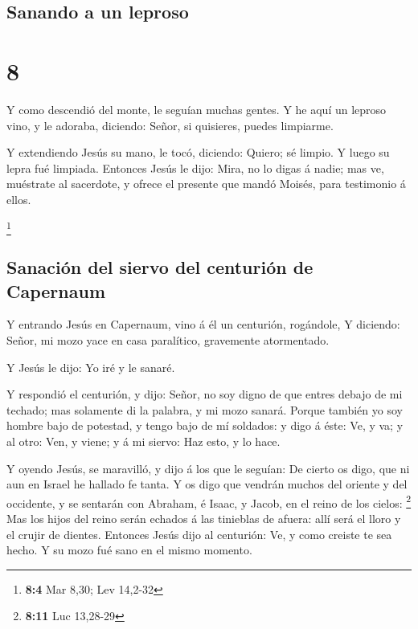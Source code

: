 \hypertarget{sanando-a-un-leproso}{%
\subsection{Sanando a un leproso}\label{sanando-a-un-leproso}}

\hypertarget{section-7}{%
\section{8}\label{section-7}}

 Y como descendió del monte, le seguían muchas gentes.
 Y he aquí un leproso vino, y le adoraba, diciendo: Señor,
si quisieres, puedes limpiarme.

 Y extendiendo Jesús su mano, le tocó, diciendo: Quiero; sé
limpio. Y luego su lepra fué limpiada.  Entonces Jesús le
dijo: Mira, no lo digas á nadie; mas ve, muéstrate al sacerdote, y
ofrece el presente que mandó Moisés, para testimonio á ellos.

\footnote{\textbf{8:4} Mar 8,30; Lev 14,2-32}

\hypertarget{sanaciuxf3n-del-siervo-del-centuriuxf3n-de-capernaum}{%
\subsection{Sanación del siervo del centurión de
Capernaum}\label{sanaciuxf3n-del-siervo-del-centuriuxf3n-de-capernaum}}

 Y entrando Jesús en Capernaum, vino á él un centurión,
rogándole,  Y diciendo: Señor, mi mozo yace en casa
paralítico, gravemente atormentado.

 Y Jesús le dijo: Yo iré y le sanaré.

 Y respondió el centurión, y dijo: Señor, no soy digno de
que entres debajo de mi techado; mas solamente di la palabra, y mi mozo
sanará.  Porque también yo soy hombre bajo de potestad, y
tengo bajo de mí soldados: y digo á éste: Ve, y va; y al otro: Ven, y
viene; y á mi siervo: Haz esto, y lo hace.

 Y oyendo Jesús, se maravilló, y dijo á los que le seguían:
De cierto os digo, que ni aun en Israel he hallado fe tanta.
 Y os digo que vendrán muchos del oriente y del occidente,
y se sentarán con Abraham, é Isaac, y Jacob, en el reino de los cielos:
\footnote{\textbf{8:11} Luc 13,28-29}  Mas los hijos del
reino serán echados á las tinieblas de afuera: allí será el lloro y el
crujir de dientes.  Entonces Jesús dijo al centurión: Ve, y
como creiste te sea hecho. Y su mozo fué sano en el mismo momento.

